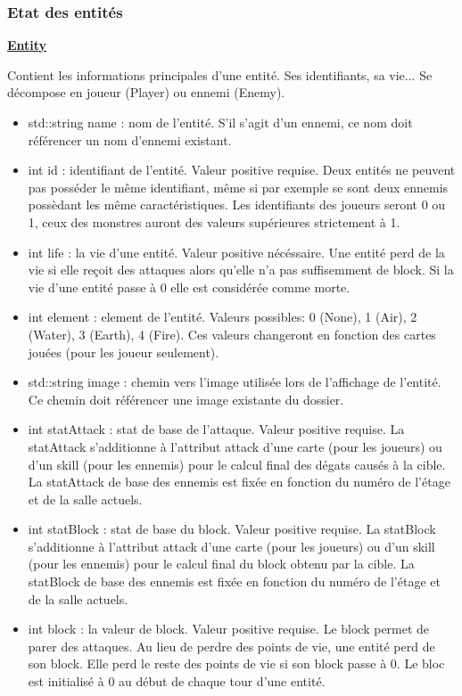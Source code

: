 \subsubsection{Etat des entités}
\underline{\textbf{Entity}}
\par Contient les informations principales d'une entité. Ses identifiants, sa vie... Se décompose en joueur (Player) ou ennemi (Enemy).
\begin{itemize}
    \item std::string name : nom de l'entité. S'il s'agit d'un ennemi, ce nom doit référencer un nom d'ennemi existant. 
    \item int id : identifiant de l'entité. Valeur positive requise. Deux entités ne peuvent pas posséder le même identifiant, même si par exemple se sont deux ennemis possèdant les même caractéristiques. Les identifiants des joueurs seront 0 ou 1, ceux des monstres auront des valeurs supérieures strictement à 1.
    \item int life : la vie d'une entité. Valeur positive nécéssaire. Une entité perd de la vie si elle reçoit des attaques alors qu'elle n'a pas suffisemment de block. Si la vie d'une entité passe à 0 elle est considérée comme morte.
    \item int element : element de l'entité. Valeurs possibles: 0 (None), 1 (Air), 2 (Water), 3 (Earth), 4 (Fire). Ces valeurs changeront en fonction des cartes jouées (pour les joueur seulement).
    \item std::string image : chemin vers l'image utilisée lors de l'affichage de l'entité. Ce chemin doit référencer une image existante du dossier.
    \item int statAttack : stat de base de l'attaque. Valeur positive requise. La statAttack s'additionne à l'attribut attack d'une carte (pour les joueurs) ou d'un skill (pour les ennemis) pour le calcul final des dégats causés à la cible. La statAttack de base des ennemis est fixée en fonction du numéro de l'étage  et de la salle actuels.
    \item int statBlock : stat de base du block. Valeur positive requise. La statBlock s'additionne à l'attribut attack d'une carte (pour les joueurs) ou d'un skill (pour les ennemis) pour le calcul final du block obtenu par la cible.  La statBlock de base des ennemis est fixée en fonction du numéro de l'étage et de la salle actuels.
    \item int block : la valeur de block. Valeur positive requise. Le block permet de parer des attaques. Au lieu de perdre des points de vie, une entité perd de son block. Elle perd le reste des points de vie si son block passe à 0. Le bloc est initialisé à 0 au début de chaque tour d'une entité.

\end{itemize}
